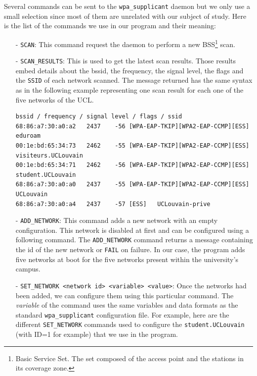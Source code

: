 Several commands can be sent to the \texttt{wpa\_supplicant} daemon but we only use a small selection since most of them are unrelated with our subject of study. Here is the list of the commands we use in our program and their meaning:

\begin{itemize}
	\item[-] \texttt{SCAN}: This command request the daemon to perform a new BSS\footnote{Basic Service Set. The set composed of the access point and the stations in its coverage zone.} scan.

	\item[-] \texttt{SCAN\_RESULTS}: This is used to get the latest scan results. Those results embed details about the bssid, the frequency, the signal level, the flags and the \texttt{SSID} of each network scanned. The message returned has the same syntax as in the following example representing one scan result for each one of the five networks of the UCL.\\

\begin{lstlisting}[frame=single,breaklines=true,caption={Scan results message example}]
bssid / frequency / signal level / flags / ssid
68:86:a7:30:a0:a2	2437	-56	[WPA-EAP-TKIP][WPA2-EAP-CCMP][ESS]	eduroam
00:1e:bd:65:34:73	2462	-55	[WPA-EAP-TKIP][WPA2-EAP-CCMP][ESS]	visiteurs.UCLouvain
00:1e:bd:65:34:71 	2462	-56	[WPA-EAP-TKIP][WPA2-EAP-CCMP][ESS]	student.UCLouvain
68:86:a7:30:a0:a0 	2437	-55	[WPA-EAP-TKIP][WPA2-EAP-CCMP][ESS]	UCLouvain
68:86:a7:30:a0:a4 	2437	-57	[ESS]	UCLouvain-prive
\end{lstlisting}

	\item[-] \texttt{ADD\_NETWORK}: This command adds a new network with an empty configuration. This network is disabled at first and can be configured using a following command. The \texttt{ADD\_NETWORK} command returns a message containing the id of the new network or \texttt{FAIL} on failure. In our case, the program adds five networks at boot for the five networks present within the university's campus.

	\item[-] \texttt{SET\_NETWORK <network id> <variable> <value>}: Once the networks had been added, we can configure them using this particular command. The \textit{variable} of the command uses the same variables and data formats as the standard \texttt{wpa\_supplicant} configuration file. For example, here are the different \texttt{SET\_NETWORK} commands used to configure the \texttt{student.UCLouvain} (with ID=1 for example) that we use in the program.\\


\end{itemize}
